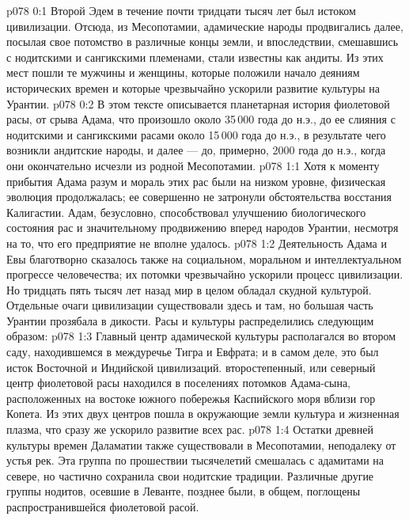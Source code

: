 \author{Архангел}
\vs p078 0:1 Второй Эдем в течение почти тридцати тысяч лет был истоком цивилизации. Отсюда, из Месопотамии, адамические народы продвигались далее, посылая свое потомство в различные концы земли, и впоследствии, смешавшись с нодитскими и сангикскими племенами, стали известны как андиты. Из этих мест пошли те мужчины и женщины, которые положили начало деяниям исторических времен и которые чрезвычайно ускорили развитие культуры на Урантии.
\vs p078 0:2 В этом тексте описывается планетарная история фиолетовой расы, от срыва Адама, что произошло около 35\,000 года до н.э., до ее слияния с нодитскими и сангикскими расами около 15\,000 года до н.э., в результате чего возникли андитские народы, и далее --- до, примерно, 2000 года до н.э., когда они окончательно исчезли из родной Месопотамии.
\vs p078 1:1 Хотя к моменту прибытия Адама разум и мораль этих рас были на низком уровне, физическая эволюция продолжалась; ее совершенно не затронули обстоятельства восстания Калигастии. Адам, безусловно, способствовал улучшению биологического состояния рас и значительному продвижению вперед народов Урантии, несмотря на то, что его предприятие не вполне удалось.
\vs p078 1:2 Деятельность Адама и Евы благотворно сказалось также на социальном, моральном и интеллектуальном прогрессе человечества; их потомки чрезвычайно ускорили процесс цивилизации. Но тридцать пять тысяч лет назад мир в целом обладал скудной культурой. Отдельные очаги цивилизации существовали здесь и там, но большая часть Урантии прозябала в дикости. Расы и культуры распределились следующим образом:
\vs p078 1:3 \bibnobreakspace {} Главный центр адамической культуры располагался во втором саду, находившемся в междуречье Тигра и Евфрата; и в самом деле, это был исток Восточной и Индийской цивилизаций. второстепенный, или северный центр фиолетовой расы находился в поселениях потомков Адама\hyp{}сына, расположенных на востоке южного побережья Каспийского моря вблизи гор Копета. Из этих двух центров пошла в окружающие земли культура и жизненная плазма, что сразу же ускорило развитие всех рас.
\vs p078 1:4 \pc {}\bibnobreakspace {} Остатки древней культуры времен Даламатии также существовали в Месопотамии, неподалеку от устья рек. Эта группа по прошествии тысячелетий смешалась с адамитами на севере, но частично сохранила свои нодитские традиции. Различные другие группы нодитов, осевшие в Леванте, позднее были, в общем, поглощены распространившейся фиолетовой расой.
